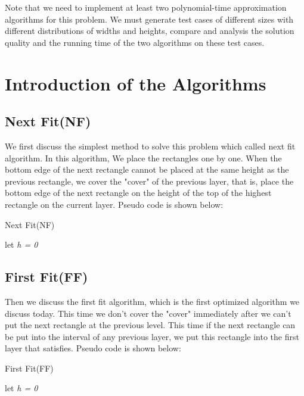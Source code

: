 \documentclass[12pt]{article}
\begin{document}
    Note that we need to implement at least two polynomial-time approximation algorithms for this problem.
    We must generate test cases of different sizes with different distributions of widths and heights,
    compare and analysis the solution quality and the running time of the two algorithms on these test cases. 

    \section{Introduction of the Algorithms}
    \subsection{Next Fit(NF)}
    We first discuss the simplest method to solve this problem which called next fit algorithm.
    In this algorithm, We place the rectangles one by one.
    When the bottom edge of the next rectangle cannot be placed at the same height as the previous rectangle,
    we cover the "cover" of the previous layer, that is,
    place the bottom edge of the next rectangle on the height of the top of the highest rectangle on the current layer.
    Pseudo code is shown below:
    \begin{algorithm}
        \caption{Next Fit(NF)}
        \LinesNumbered
        let \emph{h = 0}\;
    \end{algorithm}

    \subsection{First Fit(FF)}
    Then we discuss the first fit algorithm, which is the first optimized 
    algorithm we discuss today. This time we don't cover the "cover" immediately 
    after we can't put the next rectangle at the previous level. This time if the next 
    rectangle can be put into the interval of any previous layer, we put this rectangle 
    into the first layer that satisfies. Pseudo code is shown below:
    \begin{algorithm}
        \caption{First Fit(FF)}
        \LinesNumbered
        let \emph{h = 0}\;
    \end{algorithm}
\end{document}
